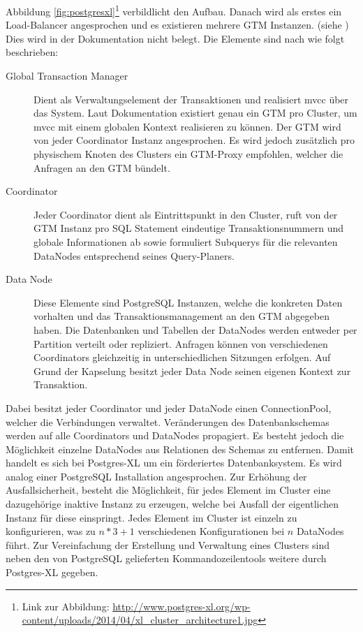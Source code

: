 Abbildung \ref{fig:postgresxl}\footnote{Link zur Abbildung: \url{http://www.postgres-xl.org/wp-content/uploads/2014/04/xl_cluster_architecture1.jpg}} verbildlicht den Aufbau.
Danach wird als erstes ein Load-Balancer angesprochen und es existieren mehrere GTM Instanzen. (siehe \cite{website:postgresxl-about})
Dies wird in der Dokumentation nicht belegt.
Die Elemente sind nach \cite{website:postgresxl-about} wie folgt beschrieben:
\begin{description}
\item[Global Transaction Manager] Dient als Verwaltungselement der Transaktionen und realisiert \Gls{mvcc} über das System. Laut Dokumentation existiert genau ein GTM pro Cluster, um \Gls{mvcc}  mit einem globalen Kontext realisieren zu können. Der GTM wird von jeder Coordinator Instanz angesprochen. Es wird jedoch zusätzlich pro physischem Knoten des Clusters ein GTM-Proxy empfohlen, welcher die Anfragen an den GTM bündelt.
\item[Coordinator] Jeder Coordinator dient als Eintrittspunkt in den Cluster, ruft von der GTM Instanz pro SQL Statement eindeutige Transaktionsnummern und globale Informationen ab sowie formuliert Subquerys für die relevanten DataNodes entsprechend seines Query-Planers.
\item[Data Node] Diese Elemente sind PostgreSQL Instanzen, welche die konkreten Daten vorhalten und das Transaktionsmanagement an den GTM abgegeben haben. Die Datenbanken und Tabellen der DataNodes werden entweder per Partition verteilt oder repliziert. Anfragen können von verschiedenen Coordinators gleichzeitig in unterschiedlichen Sitzungen erfolgen. Auf Grund der Kapselung besitzt jeder Data Node seinen eigenen Kontext zur Transaktion.
\end{description}
Dabei besitzt jeder Coordinator und jeder DataNode einen ConnectionPool, welcher die Verbindungen verwaltet.
Veränderungen des Datenbankschemas werden auf alle Coordinators und DataNodes propagiert.
Es besteht jedoch die Möglichkeit einzelne DataNodes aus Relationen des Schemas zu entfernen.
Damit handelt es sich bei Postgres-XL um ein förderiertes Datenbanksystem.
Es wird analog einer PostgreSQL Installation angesprochen.
Zur Erhöhung der Ausfallsicherheit, besteht die Möglichkeit, für jedes Element im Cluster eine dazugehörige inaktive Instanz zu erzeugen, welche bei Ausfall der eigentlichen Instanz für diese einspringt.
Jedes Element im Cluster ist einzeln zu konfigurieren, was zu $ n*3+1 $ verschiedenen Konfigurationen bei $n$ DataNodes führt.
Zur Vereinfachung der Erstellung und Verwaltung eines Clusters sind neben den von PostgreSQL gelieferten Kommandozeilentools weitere durch Postgres-XL gegeben.
